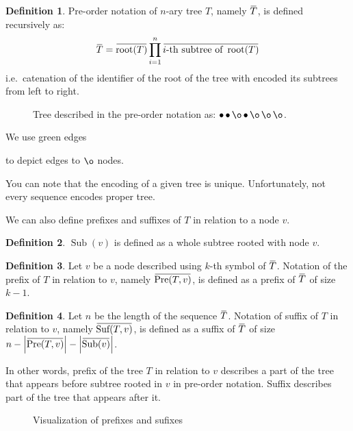 \documentclass[final]{article}
\theoremstyle{definition}
\newtheorem{definition}{Definition}[subsection]
\theoremstyle{remark}
\newcommand{\ols}[1]{\mskip.5\thinmuskip\overline{\mskip-.5\thinmuskip {#1} \mskip-.5\thinmuskip}\mskip.5\thinmuskip} %
\newcommand{\enc}[1]{\ensuremath{\ols{#1}}}
\newcommand{\size}[1]{\ensuremath{\left|#1\right|}}
\DeclareMathOperator{\troot}{\text{root}}
\DeclareMathOperator{\tSub}{\text{Sub}}
\DeclareMathOperator{\tPre}{\text{Pre}}
\DeclareMathOperator{\tSuf}{\text{Suf}}
\DeclareMathOperator{\n}{\bullet}
\DeclareMathOperator{\no}{\o}
\begin{document}
\begin{definition}
    Pre-order notation of \(n\)-ary tree \(T\), namely \(\enc{T}\), is defined recursively as:
    \[\enc{T} = \enc{\troot(T)} \prod_{i=1}^{n} \enc{i\text{-th subtree of } \troot(T)}\]
    i.e.\ catenation of the identifier of the root of the tree with encoded its subtrees from left to right.
\end{definition}

\begin{figure}[H]
    \centering
    
    \caption{Tree described in the pre-order notation as: \(\n \n \no \n \no \no \no\).}
    \label{fig:oononnn}
\end{figure}

We use green edges 
\begin{minipage}{1.5em}

\end{minipage}
to depict edges to \(\no\) nodes.

You can note that the encoding of a given tree is unique. Unfortunately, not every sequence encodes proper tree.

We can also define prefixes and suffixes of \(T\) in relation to a node \(v\).

\begin{definition}
    \(\tSub(v)\) is defined as a whole subtree rooted with node \(v\).
\end{definition}

\begin{definition}
    Let \(v\) be a node described using \(k\)-th symbol of \(\enc{T}\). Notation of the prefix of \(T\) in relation to \(v\), namely \(\enc{\tPre(T, v)}\), is defined as a prefix of \enc{T} of size \(k - 1\).
\end{definition}

\begin{definition}
    Let \(n\) be the length of the sequence \(\enc{T}\). Notation of suffix of \(T\) in relation to \(v\), namely \(\enc{\tSuf(T, v)}\), is defined as a suffix of \enc{T} of size \(n - \size{\enc{\tPre(T, v)}} - \size{\enc{\tSub(v)}}\).
\end{definition}

In other words, prefix of the tree \(T\) in relation to \(v\) describes a part of the tree that appears before subtree rooted in \(v\) in pre-order notation. Suffix describes part of the tree that appears after it.

\begin{figure}[H]
    \centering
    
    \caption{Visualization of prefixes and sufixes}
    \label{fig:presuf}
\end{figure}
\end{document}
